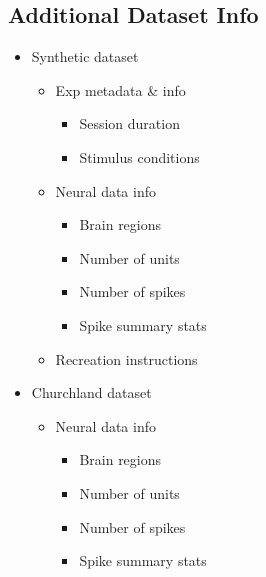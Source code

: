 \subsection{Additional Dataset Info}
\label{subsection:additional_dataset_info}

\begin{itemize}
    \item Synthetic dataset
    \begin{itemize}

        \item Exp metadata \& info
        
        \begin{itemize}
            \item Session duration
            \item Stimulus conditions
        \end{itemize}
        
        \item Neural data info
        
        \begin{itemize}
            \item Brain regions
            \item Number of units
            \item Number of spikes
            \item Spike summary stats
        \end{itemize}

        \item Recreation instructions
    
    \end{itemize}
    
    \item Churchland dataset
    \begin{itemize}
        
        \begin{itemize}
            \item Session duration
            \item Stimulus conditions
        \end{itemize}
        
        \item Neural data info
        
        \begin{itemize}
            \item Brain regions
            \item Number of units
            \item Number of spikes
            \item Spike summary stats
        \end{itemize}
        

\end{itemize}
\end{itemize}
